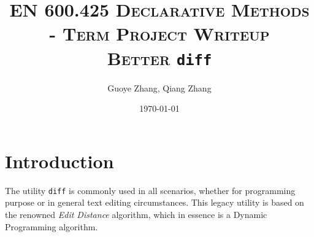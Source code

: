 \documentclass{article}
\begin{document}
\title{\textsc{EN 600.425 Declarative Methods \\ - Term Project Writeup}\\ \textbf{\textsc{Better } \texttt{diff}}} %
\author{Guoye Zhang, Qiang Zhang\\
        }  %
\date{\today}  %
\maketitle

\section{Introduction}
The utility \texttt{diff} is commonly used in all scenarios, whether for programming purpose or in general text editing circumstances. This legacy utility is based on the renowned \textit{Edit Distance} algorithm, which in essence is a Dynamic Programming algorithm. 



\end{document}
